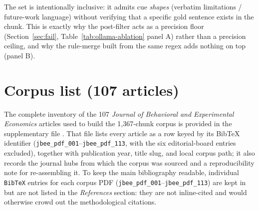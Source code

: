 \documentclass{article}
\begin{document}
\noindent The set is intentionally inclusive: it admits cue \emph{shapes} (verbatim limitations / future-work language) without verifying that a specific gold sentence exists in the chunk. This is exactly why the post-filter acts as a precision floor (Section~\ref{sec:fail}, Table~\ref{tab:ollama-ablation} panel A) rather than a precision ceiling, and why the rule-merge built from the same regex adds nothing on top (panel B).

\section{Corpus list (107 articles)}\label{app:corpus}
\noindent The complete inventory of the 107 \emph{Journal of Behavioral and Experimental Economics} articles used to build the 1{,}367-chunk corpus is provided in the supplementary file . That file lists every article as a row keyed by its BibTeX identifier (\texttt{jbee\_pdf\_001}--\texttt{jbee\_pdf\_113}, with the six editorial-board entries excluded), together with publication year, title slug, and local corpus path; it also records the journal hubs from which the corpus was sourced and a reproducibility note for re-assembling it. To keep the main bibliography readable, individual \texttt{BibTeX} entries for each corpus PDF (\texttt{jbee\_pdf\_001}--\texttt{jbee\_pdf\_113}) are kept in  but are not listed in the \emph{References} section: they are not inline-cited and would otherwise crowd out the methodological citations.



\end{document}
